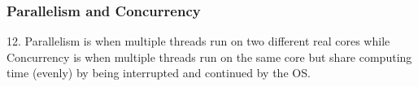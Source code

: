 \documentclass[12pt, a4paper]{article}
\begin{document}
\subsubsection*{Parallelism and Concurrency}
12. Parallelism is when multiple threads run on two different real cores while Concurrency is when multiple threads run on the same core but share computing time (evenly) by being interrupted and continued by the OS.
\end{document}
